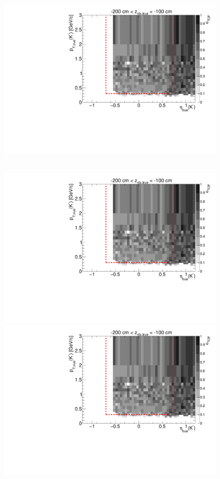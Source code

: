 \begin{figure}[hb]
{  \includegraphics[width=\linewidth,page=17]{graphics/eff/Eff2D_TOF_kaon_Minus.pdf}
}~
\parbox{0.495\textwidth}{
  \centering
  \includegraphics[width=\linewidth,page=12]{graphics/eff/Eff2D_TOF_kaon_Minus.pdf}\\
  \includegraphics[width=\linewidth,page=14]{graphics/eff/Eff2D_TOF_kaon_Minus.pdf}\\
}
\end{figure}
